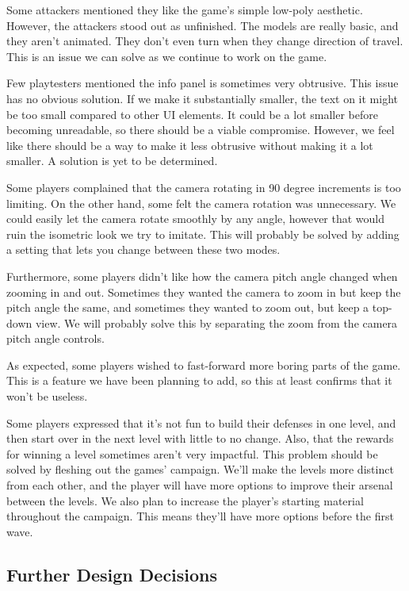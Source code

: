 Some attackers mentioned they like the game's simple low-poly aesthetic.
However, the attackers stood out as unfinished.
The models are really basic, and they aren't animated.
They don't even turn when they change direction of travel.
This is an issue we can solve as we continue to work on the game.

Few playtesters mentioned the info panel is sometimes very obtrusive.
This issue has no obvious solution.
If we make it substantially smaller, the text on it might be too small compared to other UI elements.
It could be a lot smaller before becoming unreadable, so there should be a viable compromise.
However, we feel like there should be a way to make it less obtrusive without making it a lot smaller.
A solution is yet to be determined.

Some players complained that the camera rotating in 90 degree increments is too limiting.
On the other hand, some felt the camera rotation was unnecessary.
We could easily let the camera rotate smoothly by any angle, however that would ruin the isometric look we try to imitate.
This will probably be solved by adding a setting that lets you change between these two modes.

Furthermore, some players didn't like how the camera pitch angle changed when zooming in and out.
Sometimes they wanted the camera to zoom in but keep the pitch angle the same, and sometimes they wanted to zoom out, but keep a top-down view.
We will probably solve this by separating the zoom from the camera pitch angle controls.

As expected, some players wished to fast-forward more boring parts of the game.
This is a feature we have been planning to add, so this at least confirms that it won't be useless.

Some players expressed that it's not fun to build their defenses in one level, and then start over in the next level with little to no change.
Also, that the rewards for winning a level sometimes aren't very impactful.
This problem should be solved by fleshing out the games' campaign.
We'll make the levels more distinct from each other, and the player will have more options to improve their arsenal between the levels.
We also plan to increase the player's starting material throughout the campaign.
This means they'll have more options before the first wave.

\subsection{Further Design Decisions}

